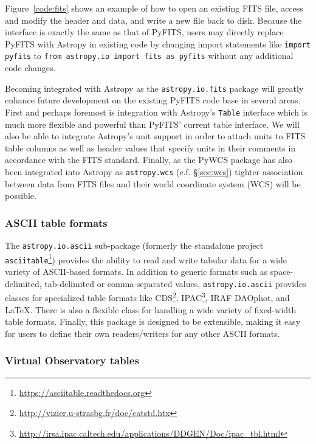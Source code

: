 \documentclass[traditabstract]{aa}
\begin{document}
Figure~\ref{code:fits} shows an
example of how to open an existing FITS file, access and modify the header and
data, and write a new file back to disk.
Because the interface is exactly the same as that of PyFITS, users may
directly replace PyFITS with Astropy in existing code by changing import
statements like \texttt{import pyfits} to \texttt{from astropy.io import fits
as pyfits} without any additional code changes.

Becoming integrated with Astropy as the \texttt{astropy.io.fits} package will
greatly enhance future development on the existing PyFITS code base in several
areas. First and perhaps foremost is integration with Astropy's \texttt{Table}
interface which is much more flexible and powerful than PyFITS' current table
interface. We will also be able to integrate Astropy's unit support in order
to attach units to FITS table columns as well as header values that specify
units in their comments in accordance with the FITS standard. Finally, as the
PyWCS package has also been integrated into Astropy as \texttt{astropy.wcs}
(c.f. \S\ref{sec:wcs}) tighter association between data from FITS files and
their world coordinate system (WCS) will be possible.

\subsubsection{ASCII table formats}

\label{sec:ascii}


The \texttt{astropy.io.ascii} sub-package (formerly the standalone project
\texttt{asciitable}\footnote{\url{https://asciitable.readthedocs.org}})
provides the ability to read and write tabular data for a wide variety of
ASCII-based formats. In addition to generic formats such as space-delimited,
tab-delimited or comma-separated values, \texttt{astropy.io.ascii} provides
classes for specialized table formats like
CDS\footnote{\url{http://vizier.u-strasbg.fr/doc/catstd.htx}},
IPAC\footnote{\url{http://irsa.ipac.caltech.edu/applications/DDGEN/Doc/ipac_tbl.html}},
IRAF DAOphot, and LaTeX. There is also a flexible class for handling
a wide variety of fixed-width table formats. Finally, this package is designed
to be extensible, making it easy for users to define their own readers/writers
for any other ASCII formats.

\subsubsection{Virtual Observatory tables}
\end{document}
